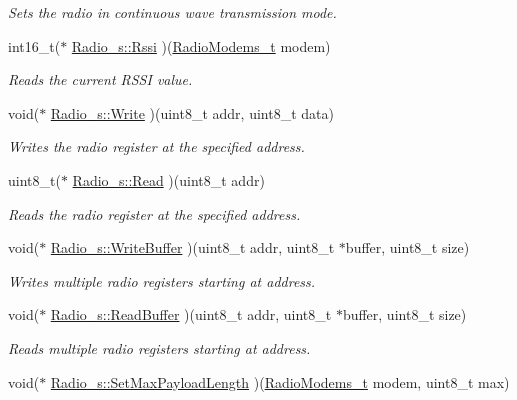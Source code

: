\begin{DoxyCompactItemize}
\begin{DoxyCompactList}\small\item\em Sets the radio in continuous wave transmission mode. \end{DoxyCompactList}\item 
int16\+\_\+t($\ast$ \hyperlink{group__LORA_gade038967fa33e964e02fe10e66d6d510}{Radio\+\_\+s\+::\+Rssi} )(\hyperlink{group__LORA_ga992ef7a5b7f52975ba7bd8dd97740057}{Radio\+Modems\+\_\+t} modem)
\begin{DoxyCompactList}\small\item\em Reads the current R\+S\+SI value. \end{DoxyCompactList}\item 
void($\ast$ \hyperlink{group__LORA_ga5f0ca54e8bc3c82d3c9b196230c325d5}{Radio\+\_\+s\+::\+Write} )(uint8\+\_\+t addr, uint8\+\_\+t data)
\begin{DoxyCompactList}\small\item\em Writes the radio register at the specified address. \end{DoxyCompactList}\item 
uint8\+\_\+t($\ast$ \hyperlink{group__LORA_ga8396bca959a0b717fabd37ac91c11534}{Radio\+\_\+s\+::\+Read} )(uint8\+\_\+t addr)
\begin{DoxyCompactList}\small\item\em Reads the radio register at the specified address. \end{DoxyCompactList}\item 
void($\ast$ \hyperlink{group__LORA_gab282c0d0a6bd7dd9f21cf79984988a8a}{Radio\+\_\+s\+::\+Write\+Buffer} )(uint8\+\_\+t addr, uint8\+\_\+t $\ast$buffer, uint8\+\_\+t size)
\begin{DoxyCompactList}\small\item\em Writes multiple radio registers starting at address. \end{DoxyCompactList}\item 
void($\ast$ \hyperlink{group__LORA_ga7ef5175264a4cf10bb6d9fa40c115dab}{Radio\+\_\+s\+::\+Read\+Buffer} )(uint8\+\_\+t addr, uint8\+\_\+t $\ast$buffer, uint8\+\_\+t size)
\begin{DoxyCompactList}\small\item\em Reads multiple radio registers starting at address. \end{DoxyCompactList}\item 
void($\ast$ \hyperlink{group__LORA_ga182fc8f265a2d02d64f3ee1c6dd5906f}{Radio\+\_\+s\+::\+Set\+Max\+Payload\+Length} )(\hyperlink{group__LORA_ga992ef7a5b7f52975ba7bd8dd97740057}{Radio\+Modems\+\_\+t} modem, uint8\+\_\+t max)

\end{DoxyCompactItemize}

